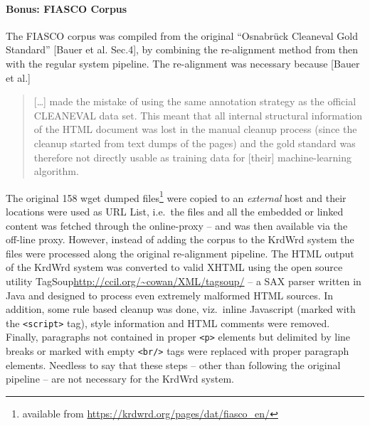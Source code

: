 \begin{longversion}
\paragraph{Bonus: FIASCO Corpus}
    The FIASCO corpus was compiled from the original ``Osnabr\"{u}ck Cleaneval Gold Standard'' [Bauer et al. Sec.4], by combining the re-alignment method from then with the regular  system pipeline. The re-alignment was necessary because [Bauer et al.]
    \begin{quote}
    [\ldots] made the mistake of using the same annotation strategy as the official
    CLEANEVAL data set. This meant that all internal structural information of the HTML
    document was lost in the manual cleanup process (since the cleanup started from text
    dumps of the pages) and the gold standard was therefore not directly usable as training
    data for [their] machine-learning algorithm.
    \end{quote}

    The original 158 wget\cite{wget} dumped files\footnote{available from \url{https://krdwrd.org/pages/dat/fiasco_en/}} were copied to an \emph{external} host and their locations were used as URL List, i.e.~the files and all the embedded or linked content was fetched through the online-proxy -- and was then available via the off-line proxy.
    However, instead of adding the corpus to the KrdWrd system the files were processed along the original re-alignment pipeline.
    The HTML output of the KrdWrd system was converted to valid XHTML using the open source utility TagSoup\url{http://ccil.org/~cowan/XML/tagsoup/} -- a SAX parser written in Java and designed to process even extremely malformed HTML sources.
    In addition, some rule based cleanup was done, viz.~inline Javascript (marked with the \texttt{<script>} tag), style information and HTML comments were removed.
    Finally, paragraphs not contained in proper \texttt{<p>} elements but delimited by line breaks or marked with empty \texttt{<br/>} tags were replaced with proper paragraph elements.
    Needless to say that these steps -- other than following the original pipeline -- are not necessary for the KrdWrd system.


\end{longversion}
